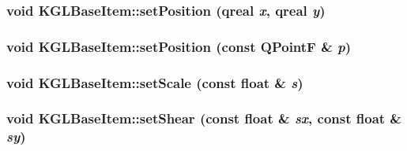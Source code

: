 \hypertarget{class_k_g_l_base_item_f9b1881b93773e84b1a2bd1483183d2e}{
\subsubsection[{setPosition}]{\setlength{\rightskip}{0pt plus 5cm}void KGLBaseItem::setPosition (qreal {\em x}, \/  qreal {\em y})}}
\label{class_k_g_l_base_item_f9b1881b93773e84b1a2bd1483183d2e}


\hypertarget{class_k_g_l_base_item_05ad2bc6e34005638626afda94f53269}{
\subsubsection[{setPosition}]{\setlength{\rightskip}{0pt plus 5cm}void KGLBaseItem::setPosition (const QPointF \& {\em p})}}
\label{class_k_g_l_base_item_05ad2bc6e34005638626afda94f53269}


\hypertarget{class_k_g_l_base_item_d3b52ffc2c83b762a2bd0d678215295e}{
\subsubsection[{setScale}]{\setlength{\rightskip}{0pt plus 5cm}void KGLBaseItem::setScale (const float \& {\em s})}}
\label{class_k_g_l_base_item_d3b52ffc2c83b762a2bd0d678215295e}


\hypertarget{class_k_g_l_base_item_19095252a25d1c9fdcf1950625ed81e4}{
\subsubsection[{setShear}]{\setlength{\rightskip}{0pt plus 5cm}void KGLBaseItem::setShear (const float \& {\em sx}, \/  const float \& {\em sy})}}
\label{class_k_g_l_base_item_19095252a25d1c9fdcf1950625ed81e4}


